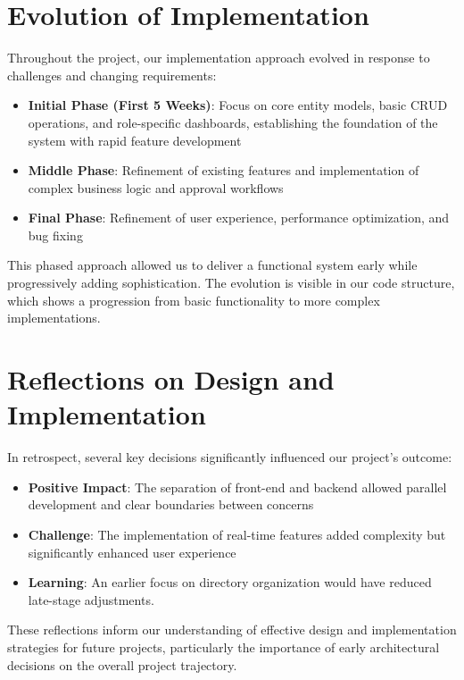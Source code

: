 \section{Evolution of Implementation}

Throughout the project, our implementation approach evolved in response to challenges and changing requirements:

\begin{itemize}
    \item \textbf{Initial Phase (First 5 Weeks)}: Focus on core entity models, basic CRUD operations, and role-specific dashboards, establishing the foundation of the system with rapid feature development
    \item \textbf{Middle Phase}: Refinement of existing features and implementation of complex business logic and approval workflows
    \item \textbf{Final Phase}: Refinement of user experience, performance optimization, and bug fixing
\end{itemize}

This phased approach allowed us to deliver a functional system early while progressively adding sophistication. The evolution is visible in our code structure, which shows a progression from basic functionality to more complex implementations.

\section{Reflections on Design and Implementation}

In retrospect, several key decisions significantly influenced our project's outcome:

\begin{itemize}
    \item \textbf{Positive Impact}: The separation of front-end and backend allowed parallel development and clear boundaries between concerns
    \item \textbf{Challenge}: The implementation of real-time features added complexity but significantly enhanced user experience
    \item \textbf{Learning}: An earlier focus on directory organization would have reduced late-stage adjustments.
\end{itemize}

These reflections inform our understanding of effective design and implementation strategies for future projects, particularly the importance of early architectural decisions on the overall project trajectory.
